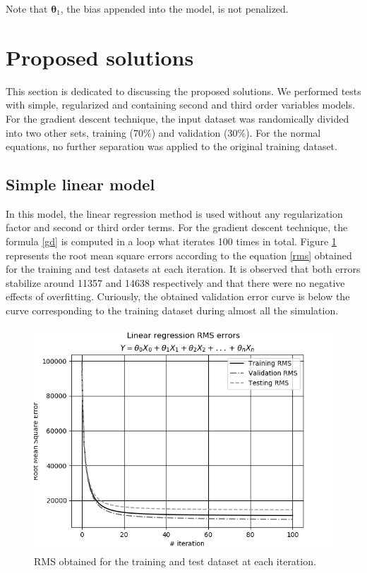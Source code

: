 \documentclass[10pt,twocolumn,letterpaper]{article}
\begin{document}
Note that \(\bm {\theta}_1 \), the bias appended into the model, is not penalized.

\section{Proposed solutions}

This section is dedicated to discussing the proposed solutions. We performed tests with simple, regularized and containing second and third order variables models. For the gradient descent technique, the input dataset was randomically divided into two other sets, training (70\%) and validation (30\%). For the normal equations, no further separation was applied to the original training dataset.

\subsection {Simple linear model}

In this model, the linear regression method is used without any regularization factor and second or third order terms. For the gradient descent technique, the formula \ref {gd} is computed in a loop what iterates 100 times in total. Figure \ref {fig:lr-gd} represents the root mean square errors according to the equation \ref{rms} obtained for the training and  test datasets at each iteration. It is observed that both errors stabilize around 11357 and 14638 respectively and that there were no negative effects of overfitting. Curiously, the obtained validation error curve is below the curve corresponding to the training dataset during almost all the simulation.

\begin{figure}
    \centering
    \includegraphics[width=0.9\columnwidth]{img/lr-gd.png}
    \caption{RMS obtained for the training and test dataset at each iteration.}
    \label{fig:lr-gd}
\end{figure}
\end{document}
